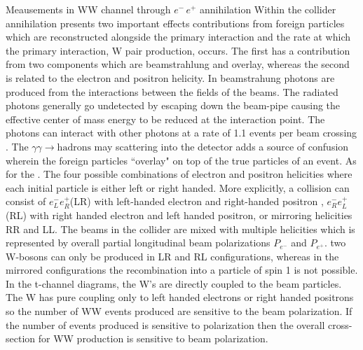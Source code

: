   
   






  
  Meausements in WW channel through  $e^- \, e^+$ annihilation Within the collider annihilation presents two important effects contributions from foreign particles which are reconstructed alongside the primary interaction and the rate at which the primary interaction, W pair production, occurs. The first has a contribution from two components which are beamstrahlung and overlay, whereas the second is related to the electron and positron helicity. In beamstrahung photons are produced from the interactions between the fields of the beams. The radiated photons generally go undetected by escaping down the beam-pipe causing the effective center of mass energy to be reduced at the interaction point. The photons can interact with other photons at a rate of 1.1 events per beam crossing \cite{ILDTDR}. The $\gamma \gamma \rightarrow \text{hadrons}$ may scattering into the detector adds a source of confusion wherein the foreign particles ``overlay" on top of the true particles of an event.
  As for the . The four possible combinations of electron and positron helicities where each initial particle is either left or right handed. More explicitly, a collision can consist of  $e^-_L e^+_R$(LR) with left-handed electron and right-handed positron , $e^-_R e^+_L$(RL)  with right handed electron and left handed positron, or mirroring helicities RR and LL.  The beams in the collider are mixed with multiple helicities which is represented by overall partial longitudinal beam polarizations $P_{e^-}$ and $ P_{e^+}$.  two W-bosons can only be produced in LR and RL configurations, whereas in the mirrored configurations the  recombination into a particle of spin 1 is  not possible. In the t-channel diagrams, the W's are directly coupled to the beam particles. The W has pure coupling only to left handed electrons or right handed positrons so the number of  WW events produced are sensitive to the beam polarization\cite{thomson}.  If the number of events produced is sensitive to polarization then the overall cross-section for WW production is sensitive to beam polarization. 











